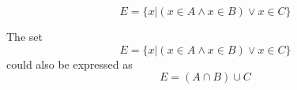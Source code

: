 \documentclass[main.tex]{subfiles}
\begin{document}
\subproblem{}\label{7b}

\[E = \{x | (x \in A \land x \in B) \lor x \in C\}\]
\begin{remark}
	The set
	\[E = \{x | (x \in A \land x \in B) \lor x \in C\}\]
	could also be expressed as
	\[E = (A \cap B) \cup C\]
\end{remark}
\end{document}
